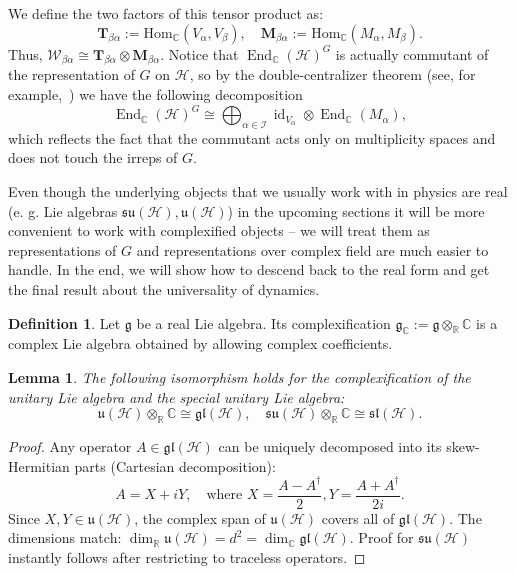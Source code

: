 \documentclass[11pt,letterpaper]{article}
\newcounter{alg}
\theoremstyle{plain}
\theoremstyle{plain}
\theoremstyle{plain}
\theoremstyle{plain}
\theoremstyle{plain}
\theoremstyle{plain}
\newcommand{\C}{\mathbb{C}}
\newcommand{\Hom}{\mathrm{Hom}}
\newcommand{\gl}{\mathfrak{gl}}
\newcommand{\su}{\mathfrak{su}}
\newcommand{\uu}{\mathfrak{u}}
\newcommand{\slc}{\mathfrak{sl}}
\newcommand{\HH}{\mathcal{H}}
\theoremstyle{plain}
\newtheorem{smlemma}[smtheorem]{Lemma}
\theoremstyle{definition}
\newtheorem{smdefinition}[smtheorem]{Definition}
\theoremstyle{plain}
\begin{document}
We define the two factors of this tensor product as:
\begin{equation}\label{eq:tensor_product_factors}
    \mathbf{T}_{\beta\alpha} := \Hom_\C(V_\alpha, V_\beta), \quad \mathbf{M}_{\beta\alpha} := \Hom_\C(M_\alpha, M_\beta).
\end{equation}
Thus, $\mathcal{W}_{\beta\alpha} \cong \mathbf{T}_{\beta\alpha} \otimes \mathbf{M}_{\beta\alpha}$. 
Notice that $\operatorname{End}_{\mathbb{C}}(\mathcal{H})^G$ is actually commutant of the representation of $G$ on $\HH$, so by the double-centralizer theorem (see, for example,~\cite{GoodmanWallach2009}) we have the following decomposition
\[
    \operatorname{End}_{\mathbb{C}}(\mathcal{H})^G \cong \bigoplus_{\alpha \in \mathcal{I}} \operatorname{id}_{V_\alpha} \otimes \operatorname{End}_{\mathbb{C}}\left(M_\alpha\right),
\]
which reflects the fact that the commutant acts only on multiplicity spaces and does not touch the irreps of $G$.

Even though the underlying objects that we usually work with in physics are real (e. g. Lie algebras $\mathfrak{su}(\HH), \mathfrak{u}(\HH)$) in the upcoming sections it will be more convenient to work with complexified objects -- we will 
treat them as representations of $G$ and representations over complex field are much easier to handle. In the end, we will show how to descend back to the real form and get the final result about the universality of dynamics.

\begin{smdefinition}\label{def:complexification}
    Let $\mathfrak{g}$ be a real Lie algebra. Its complexification $\mathfrak{g}_\mathbb{C} := \mathfrak{g} \otimes_{\mathbb{R}} \mathbb{C}$ is a complex Lie algebra obtained by allowing complex coefficients.
\end{smdefinition}

\begin{smlemma}\label{lem:complexification}
    The following isomorphism holds for the complexification of the unitary Lie algebra and the special unitary Lie algebra:
    \begin{equation*}
        \uu(\mathcal{H}) \otimes_{\mathbb{R}} \mathbb{C} \cong \gl(\mathcal{H}), \quad \su(\mathcal{H}) \otimes_{\mathbb{R}} \mathbb{C} \cong \slc(\mathcal{H}).
    \end{equation*}
\end{smlemma}

\begin{proof}
    Any operator $A \in \gl(\mathcal{H})$ can be uniquely decomposed into its skew-Hermitian parts (Cartesian decomposition):
    \[ A = X + iY, \quad \text{where } X = \frac{A - A^\dagger}{2}, Y = \frac{A + A^\dagger}{2i}. \]
    Since $X, Y \in \uu(\mathcal{H})$, the complex span of $\uu(\mathcal{H})$ covers all of $\gl(\mathcal{H})$. The dimensions match: $\dim_{\mathbb{R}}\uu(\mathcal{H}) = d^2 = \dim_{\mathbb{C}}\gl(\mathcal{H})$.
    Proof for $\su(\mathcal{H})$ instantly follows after restricting to traceless operators.
\end{proof}
\end{document}
